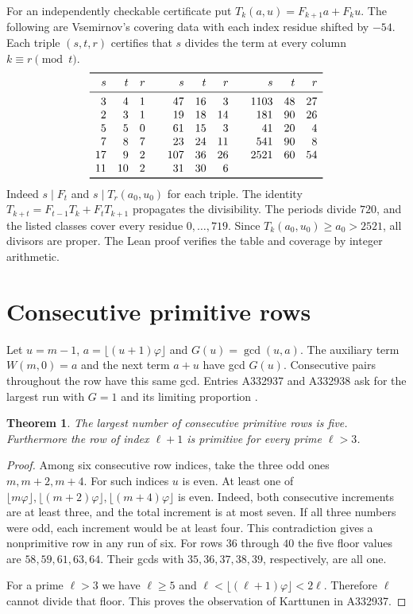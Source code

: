 \documentclass[11pt]{article}
\newtheorem{theorem}{Theorem}
\newcommand{\ph}{\varphi}
\newcommand{\fl}[1]{\lfloor #1\rfloor}
\begin{document}
For an independently checkable certificate put $T_k(a,u)=F_{k+1}a+F_k u$.
The following are Vsemirnov's covering data with each index residue shifted
by $-54$. Each triple $(s,t,r)$ certifies that $s$ divides the term at every
column $k\equiv r\pmod t$.
\[
\begin{array}{rrr@{\qquad}rrr@{\qquad}rrr}
\toprule
s&t&r&s&t&r&s&t&r\\\midrule
3&4&1&47&16&3&1103&48&27\\
2&3&1&19&18&14&181&90&26\\
5&5&0&61&15&3&41&20&4\\
7&8&7&23&24&11&541&90&8\\
17&9&2&107&36&26&2521&60&54\\
11&10&2&31&30&6&&&\\\bottomrule
\end{array}
\]
Indeed $s\mid F_t$ and $s\mid T_r(a_0,u_0)$ for each triple. The identity
$T_{k+t}=F_{t-1}T_k+F_tT_{k+1}$ propagates the divisibility.
The periods divide $720$, and the listed classes cover every residue
$0,\ldots,719$. Since $T_k(a_0,u_0)\ge a_0>2521$, all divisors are proper.
The Lean proof verifies the table and coverage by integer arithmetic.

\section{Consecutive primitive rows}
Let $u=m-1$, $a=\fl{(u+1)\ph}$ and $G(u)=\gcd(u,a)$.
The auxiliary term $W(m,0)=a$ and the next term $a+u$ have gcd $G(u)$.
Consecutive pairs throughout the row have this same gcd. Entries A332937
and A332938 ask for the largest run with $G=1$ and its limiting proportion
\cite{primitive}.

\begin{theorem}
The largest number of consecutive primitive rows is five.
Furthermore the row of index $\ell+1$ is primitive for every prime $\ell>3$.
\end{theorem}
\begin{proof}
Among six consecutive row indices, take the three odd ones $m,m+2,m+4$.
For such indices $u$ is even. At least one of
$\fl{m\ph},\fl{(m+2)\ph},\fl{(m+4)\ph}$ is even. Indeed, both consecutive
increments are at least three, and the total increment is at most seven.
If all three numbers were odd, each increment would be at least four.
This contradiction gives a nonprimitive row in any run of six.
For rows $36$ through $40$ the five floor values are $58,59,61,63,64$.
Their gcds with $35,36,37,38,39$, respectively, are all one.

For a prime $\ell>3$ we have $\ell\ge5$ and
$\ell<\fl{(\ell+1)\ph}<2\ell$. Therefore $\ell$ cannot divide that floor.
This proves the observation of Karttunen in A332937.
\end{proof}
\end{document}
